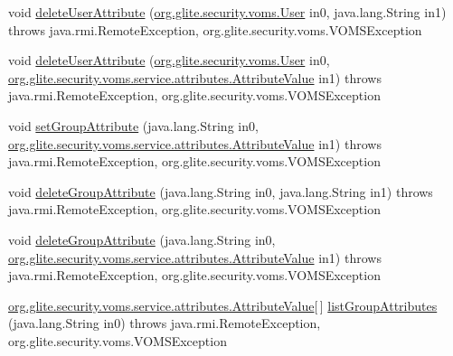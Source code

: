 \begin{DoxyCompactItemize}
\item 
void \hyperlink{classorg_1_1glite_1_1security_1_1voms_1_1service_1_1attributes_1_1VOMSAttributesSoapBindingStub_aa89aa71b8d9730d9d9de92ae2998b725}{deleteUserAttribute} (\hyperlink{classorg_1_1glite_1_1security_1_1voms_1_1User}{org.glite.security.voms.User} in0, java.lang.String in1)  throws java.rmi.RemoteException, org.glite.security.voms.VOMSException 
\item 
void \hyperlink{classorg_1_1glite_1_1security_1_1voms_1_1service_1_1attributes_1_1VOMSAttributesSoapBindingStub_af3bae4b1b18536556a5ff5d11724a737}{deleteUserAttribute} (\hyperlink{classorg_1_1glite_1_1security_1_1voms_1_1User}{org.glite.security.voms.User} in0, \hyperlink{classorg_1_1glite_1_1security_1_1voms_1_1service_1_1attributes_1_1AttributeValue}{org.glite.security.voms.service.attributes.AttributeValue} in1)  throws java.rmi.RemoteException, org.glite.security.voms.VOMSException 
\item 
void \hyperlink{classorg_1_1glite_1_1security_1_1voms_1_1service_1_1attributes_1_1VOMSAttributesSoapBindingStub_a39bd8a9cce30d9a751ef6639c7f8a623}{setGroupAttribute} (java.lang.String in0, \hyperlink{classorg_1_1glite_1_1security_1_1voms_1_1service_1_1attributes_1_1AttributeValue}{org.glite.security.voms.service.attributes.AttributeValue} in1)  throws java.rmi.RemoteException, org.glite.security.voms.VOMSException 
\item 
void \hyperlink{classorg_1_1glite_1_1security_1_1voms_1_1service_1_1attributes_1_1VOMSAttributesSoapBindingStub_ab2eb55d5b54e2bbed488f6905bca014f}{deleteGroupAttribute} (java.lang.String in0, java.lang.String in1)  throws java.rmi.RemoteException, org.glite.security.voms.VOMSException 
\item 
void \hyperlink{classorg_1_1glite_1_1security_1_1voms_1_1service_1_1attributes_1_1VOMSAttributesSoapBindingStub_a8b783513e7320e2e1c6549c041ae9e05}{deleteGroupAttribute} (java.lang.String in0, \hyperlink{classorg_1_1glite_1_1security_1_1voms_1_1service_1_1attributes_1_1AttributeValue}{org.glite.security.voms.service.attributes.AttributeValue} in1)  throws java.rmi.RemoteException, org.glite.security.voms.VOMSException 
\item 
\hyperlink{classorg_1_1glite_1_1security_1_1voms_1_1service_1_1attributes_1_1AttributeValue}{org.glite.security.voms.service.attributes.AttributeValue}\mbox{[}$\,$\mbox{]} \hyperlink{classorg_1_1glite_1_1security_1_1voms_1_1service_1_1attributes_1_1VOMSAttributesSoapBindingStub_ac62650ea5c7fb1e7dbafab9eebbf040c}{listGroupAttributes} (java.lang.String in0)  throws java.rmi.RemoteException, org.glite.security.voms.VOMSException 

\end{DoxyCompactItemize}
